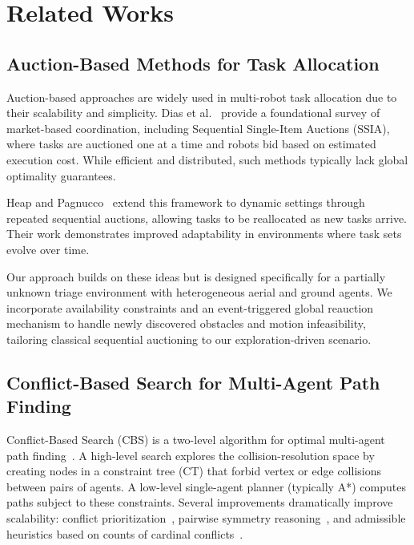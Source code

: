 \documentclass[conference]{IEEEtran}
\begin{document}
\section{Related Works}

\subsection{Auction-Based Methods for Task Allocation}

Auction-based approaches are widely used in multi-robot task allocation due to their scalability and simplicity. Dias et al.~\cite{dias2006market} provide a foundational survey of market-based coordination, including Sequential Single-Item Auctions (SSIA), where tasks are auctioned one at a time and robots bid based on estimated execution cost. While efficient and distributed, such methods typically lack global optimality guarantees.

Heap and Pagnucco~\cite{heap2013repeated} extend this framework to dynamic settings through repeated sequential auctions, allowing tasks to be reallocated as new tasks arrive. Their work demonstrates improved adaptability in environments where task sets evolve over time.

Our approach builds on these ideas but is designed specifically for a partially unknown triage environment with heterogeneous aerial and ground agents. We incorporate availability constraints and an event-triggered global reauction mechanism to handle newly discovered obstacles and motion infeasibility, tailoring classical sequential auctioning to our exploration-driven scenario.

\subsection{Conflict-Based Search for Multi-Agent Path Finding}

Conflict-Based Search (CBS) is a two-level algorithm for optimal multi-agent path finding~\cite{sharon2012cbs}. A high-level search explores the collision-resolution space by creating nodes in a constraint tree (CT) that forbid vertex or edge collisions between pairs of agents. A low-level single-agent planner (typically A*) computes paths subject to these constraints. Several improvements dramatically improve scalability: conflict prioritization~\cite{boyarski2015icbs}, pairwise symmetry reasoning~\cite{li2021symmetry}, and admissible heuristics based on counts of cardinal conflicts~\cite{felner2018heuristics}.
\end{document}
